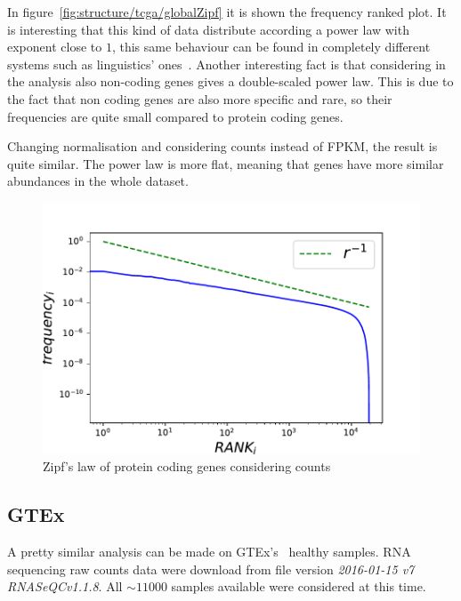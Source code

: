 In figure~\ref{fig:structure/tcga/globalZipf} it is shown the frequency ranked plot. It is interesting that this kind of data distribute according a power law with exponent close to $1$, this same behaviour can be found in completely different systems such as linguistics' ones~\cite{altmann2016statistical}. Another interesting fact is that considering in the analysis also non-coding genes gives a double-scaled power law. This is due to the fact that non coding genes are also more specific and rare, so their frequencies are quite small compared to protein coding genes.

Changing normalisation and considering counts instead of FPKM, the result is quite similar. The power law is more flat, meaning that genes have more similar abundances in the whole dataset. 
\begin{figure}
    \centering
    \includegraphics[width=0.8\linewidth]{pictures/structure/tcga/globalzipf_counts.pdf}
    \caption{Zipf's law of protein coding genes considering counts}
    \label{fig:structure/tcga/globalzipf_count}
\end{figure}

\subsection{GTEx}
A pretty similar analysis can be made on GTEx's~\cite{carithers2015novel} healthy samples. RNA sequencing raw counts data were download from file version \textit{2016-01-15 v7 RNASeQCv1.1.8}. All $\sim 11000$ samples available were considered at this time.

